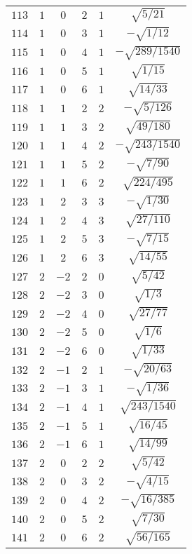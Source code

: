 \begin{table}
\begin{center}
\begin{tabular}{|c|c|c|c|c|c|}
$113$ & $1$ & $0$ & $2$ & $1$ & $\sqrt{5/21}$ \\ 
$114$ & $1$ & $0$ & $3$ & $1$ & $-\sqrt{1/12}$ \\ 
$115$ & $1$ & $0$ & $4$ & $1$ & $-\sqrt{289/1540}$ \\ 
$116$ & $1$ & $0$ & $5$ & $1$ & $\sqrt{1/15}$ \\ 
$117$ & $1$ & $0$ & $6$ & $1$ & $\sqrt{14/33}$ \\ 
$118$ & $1$ & $1$ & $2$ & $2$ & $-\sqrt{5/126}$ \\ 
$119$ & $1$ & $1$ & $3$ & $2$ & $\sqrt{49/180}$ \\ 
$120$ & $1$ & $1$ & $4$ & $2$ & $-\sqrt{243/1540}$ \\ 
$121$ & $1$ & $1$ & $5$ & $2$ & $-\sqrt{7/90}$ \\ 
$122$ & $1$ & $1$ & $6$ & $2$ & $\sqrt{224/495}$ \\ 
$123$ & $1$ & $2$ & $3$ & $3$ & $-\sqrt{1/30}$ \\ 
$124$ & $1$ & $2$ & $4$ & $3$ & $\sqrt{27/110}$ \\ 
$125$ & $1$ & $2$ & $5$ & $3$ & $-\sqrt{7/15}$ \\ 
$126$ & $1$ & $2$ & $6$ & $3$ & $\sqrt{14/55}$ \\ 
$127$ & $2$ & $-2$ & $2$ & $0$ & $\sqrt{5/42}$ \\ 
$128$ & $2$ & $-2$ & $3$ & $0$ & $\sqrt{1/3}$ \\ 
$129$ & $2$ & $-2$ & $4$ & $0$ & $\sqrt{27/77}$ \\ 
$130$ & $2$ & $-2$ & $5$ & $0$ & $\sqrt{1/6}$ \\ 
$131$ & $2$ & $-2$ & $6$ & $0$ & $\sqrt{1/33}$ \\ 
$132$ & $2$ & $-1$ & $2$ & $1$ & $-\sqrt{20/63}$ \\ 
$133$ & $2$ & $-1$ & $3$ & $1$ & $-\sqrt{1/36}$ \\ 
$134$ & $2$ & $-1$ & $4$ & $1$ & $\sqrt{243/1540}$ \\ 
$135$ & $2$ & $-1$ & $5$ & $1$ & $\sqrt{16/45}$ \\ 
$136$ & $2$ & $-1$ & $6$ & $1$ & $\sqrt{14/99}$ \\ 
$137$ & $2$ & $0$ & $2$ & $2$ & $\sqrt{5/42}$ \\ 
$138$ & $2$ & $0$ & $3$ & $2$ & $-\sqrt{4/15}$ \\ 
$139$ & $2$ & $0$ & $4$ & $2$ & $-\sqrt{16/385}$ \\ 
$140$ & $2$ & $0$ & $5$ & $2$ & $\sqrt{7/30}$ \\ 
$141$ & $2$ & $0$ & $6$ & $2$ & $\sqrt{56/165}$ \\ 

\end{tabular}
\end{center}
\end{table}
